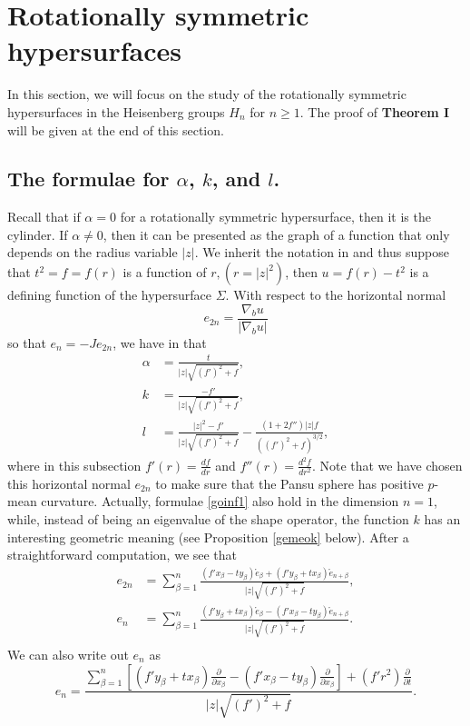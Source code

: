 \documentclass[12pt]{amsart}
\theoremstyle{definition}\newtheorem{exa}[thm]{\sc Example}
\theoremstyle{definition}\newtheorem{de}[thm]{\sc Definition}
\theoremstyle{definition}\newtheorem{rem}[thm]{\sc Remark}
\theoremstyle{definition}\newtheorem{prob}[thm]{\it Problem}
\theoremstyle{definition}\newtheorem{fact}[thm]{\sc Fact}
\theoremstyle{definition}\newtheorem{claim}[thm]{\sc Claim}
\numberwithin{equation}{section}
\begin{document}
\section{Rotationally symmetric hypersurfaces}\label{sorss}
In this section, we will focus on the study of the rotationally symmetric hypersurfaces in the Heisenberg groups $H_{n}$ for $n\geq 1$. The proof of {\bf Theorem I} will be given at the end of this section.

\subsection{The formulae for $\alpha$, $k$, and $l$.}
Recall that if $\alpha=0$ for a rotationally symmetric hypersurface, then it is the cylinder. If $\alpha\neq 0$, then it can be presented as  the graph of a function that only depends on the radius variable $|z|$. We inherit the notation in \cite{CCHY1} and thus suppose that $t^2=f=f(r)$ is a function of $r, (r=|z|^2)$, then $u=f(r)-t^{2}$ is a defining function of the hypersurface $\Sigma$. 
With respect to 
the horizontal normal
\begin{equation}\label{honor}
e_{2n}=\frac{\nabla_{b}u}{|\nabla_{b}u|}
\end{equation} so that $e_{n}=-Je_{2n}$, we have in \cite{CCHY1} that
\begin{equation}\label{goinf1}
\begin{split}
\alpha&=\frac{t}{|z|\sqrt{(f')^2+f}},\\
k&=\frac{-f'}{|z|\sqrt{(f')^2+f}},\\ 
l&=\frac{|z|^2-f'}{|z|\sqrt{(f')^2+f}}-\frac{(1+2f'')|z|f}{((f')^2+f)^{3/2}},
\end{split}
\end{equation}
where in this subsection $f'(r)=\frac{df}{dr}$ and $f''(r)=\frac{d^2f}{dr^2}$.  Note that we have chosen this horizontal normal $e_{2n}$ to make sure that the Pansu sphere has positive $p$-mean curvature. Actually, formulae \eqref{goinf1} also hold  in the dimension $n=1$, while, instead of being an eigenvalue of the shape operator, the function $k$ has an interesting geometric meaning (see Proposition \ref{gemeok} below). 
After a straightforward computation, we see that
\begin{equation}\label{ori01}
\begin{split}
e_{2n}&=\sum_{\beta=1}^{n}\frac{(f'x_{\beta}-ty_{\beta})\mathring{e}_{\beta}+(f'y_{\beta}+tx_{\beta})\mathring{e}_{n+\beta}}{|z|\sqrt{(f')^{2}+f}},\\
e_{n}&=\sum_{\beta=1}^{n}\frac{(f'y_{\beta}+tx_{\beta})\mathring{e}_{\beta}-(f'x_{\beta}-ty_{\beta})\mathring{e}_{n+\beta}}{|z|\sqrt{(f')^{2}+f}}.\\
\end{split}
\end{equation}
We can also write out $e_{n}$ as
\begin{equation}\label{ori02}
e_{n}=\frac{\sum_{\beta=1}^{n}[(f'y_{\beta}+tx_{\beta})\frac{\partial}{\partial x_{\beta}}-(f'x_{\beta}-ty_{\beta})\frac{\partial}{\partial x_{\beta}}]+(f'r^2)\frac{\partial}{\partial t}}{|z|\sqrt{(f')^{2}+f}}.
\end{equation}
\end{document}

